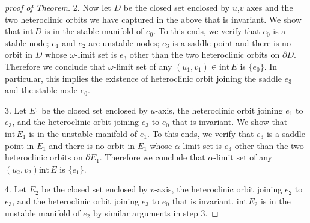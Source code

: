 \documentclass{amsart}
\def\blue{\color{blue}}
\theoremstyle{definition}
\numberwithin{equation}{section}
\def\ii{{\textrm{int}}\,}
\begin{document}
\begin{proof}[proof of Theorem]
% 
% 
% 

2. Now let $D$ be the closed set enclosed by $u$,$v$ axes and the two heteroclinic orbits we have captured in the above that is invariant. We show that $\ii D$ is in the stable manifold of $e_0$. To this ends, we verify that $e_0$ is a stable node; $e_1$ and $e_2$ are unstable nodes; $e_3$ is a saddle point and there is no orbit in $D$ whose $\omega$-limit set is $e_3$ other than the two heteroclinic orbits on $\partial D$. Therefore we conclude that $\omega$-limit set of any $(u_1,v_1) \in \ii E$ is $\{e_0\}$. In particular, this implies the existence of heteroclinic orbit joining the saddle $e_3$ and the stable node $e_0$.

3. Let $E_1$ be the closed set enclosed by $u$-axis, the heteroclinic orbit joining $e_1$ to $e_3$, and the heteroclinic orbit joining $e_3$ to $e_0$ that is invariant. We show that $\ii E_1$ is in the unstable manifold of $e_1$. To this ends, we verify that $e_3$ is a saddle point in $E_1$ and there is no orbit in $E_1$ whose $\alpha$-limit set is $e_3$ other than the two heteroclinic orbits on $\partial E_1$. Therefore we conclude that $\alpha$-limit set of any $(u_2,v_2)\ii E$ is $\{e_1\}$.

4. Let $E_2$ be the closed set enclosed by $v$-axis, the heteroclinic orbit joining $e_2$ to $e_3$, and the heteroclinic orbit joining $e_3$ to $e_0$ that is invariant. $\ii E_2$ is in the unstable manifold of $e_2$ by similar arguments in step 3. 
% 


\end{proof}
\end{document}
